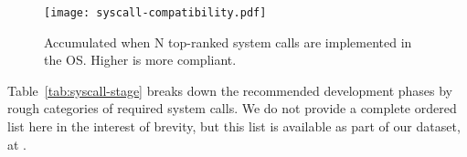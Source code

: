\begin{figure}[t]
\centering
\texttt{[image: syscall-compatibility.pdf]}
\caption{Accumulated \compatmetric{} when N top-ranked system calls are implemented in the OS. Higher is more compliant.}
\label{fig:syscall-compatibility}
\end{figure}

\begin{table}[t]
\footnotesize
\caption[Proposed steps of Linux system call implemetation prioritzed by importance]
{Five stages of implementing system calls based on the \usagemetric{} ranking. For each stage, a set of system calls is listed, with the work needed to accomplish (\# of system calls) and the \compatmetric{} that can be reached.}
\label{tab:syscall-stage}
\end{table}

Table~\ref{tab:syscall-stage} breaks down the recommended development phases by rough categories of required system calls.
We do not provide a complete ordered list here in the interest of brevity, but this list is available as part of our dataset, 
at \projecturl{}.

